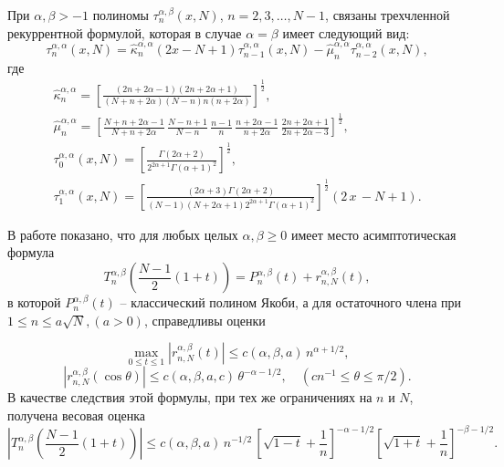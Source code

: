 При $\alpha, \beta > -1$ полиномы $\tau_n^{\alpha,\beta}(x,N)$, $n=2,3,\ldots,N-1$, связаны трехчленной рекуррентной формулой, которая в случае $\alpha=\beta$ имеет следующий вид:
\begin{equation}
\label{sob-tcheb-difference-3.19}
\tau_n^{\alpha,\alpha}(x,N)=
\hat\kappa^{\alpha,\alpha}_n(2x-N+1)\tau_{n-1}^{\alpha,\alpha}(x,N)-\hat\mu^{\alpha,\alpha}_n\tau_{n-2}^{\alpha,\alpha}(x,N),
\end{equation}
где
\begin{gather*}
\hat\kappa^{\alpha,\alpha}_n= \left[\frac{(2n+2\alpha-1)(2n+2\alpha+1)}{(N+n+2\alpha)(N-n)n(n+2\alpha)}\right]^\frac12,\\
\hat\mu^{\alpha,\alpha}_n=
\left[\frac{N+n+2\alpha-1}{N+n+2\alpha}\,\frac{N-n+1}{N-n}\,\frac{n-1}n\,
\frac{n+2\alpha-1}{n+2\alpha}\,\frac{2n+2\alpha+1}{2n+2\alpha-3}\right]^\frac12,\\
\tau_0^{\alpha,\alpha}(x,N)=\left[\frac{\Gamma(2\alpha+2)}{2^{2\alpha+1}\Gamma(\alpha+1)^2}\right]^\frac12,\\
\tau_1^{\alpha,\alpha}(x,N)=\left[\frac{(2\alpha+3)\Gamma(2\alpha+2)}{(N-1)(N+2\alpha+1)2^{2\alpha+1}\Gamma(\alpha+1)^2
}\right]^\frac12
(2\,x\,-N+1).
\end{gather*}


В работе \cite{sob-tcheb-difference-Shar16}%
показано, что для любых целых $\alpha,\beta \geq 0$ имеет место асимптотическая формула
\begin{equation}\label{asymptf}
 T_{n}^{\alpha,\beta}\left( \frac{N-1}{2}(1+t) \right) = P_{n}^{\alpha,\beta}(t)+r_{n,N}^{\alpha,\beta}(t),
\end{equation}
в которой $P_{n}^{\alpha,\beta}(t)$ -- классический полином Якоби, а для остаточного члена при $1 \leq n \leq a\sqrt{N}, (a>0)$, справедливы оценки

\begin{equation}\label{asymptRest1}
  \max\limits_{0\leq t \leq 1} |r_{n,N}^{\alpha,\beta}(t)| \leq c(\alpha,\beta,a)\,n^{\alpha+1/2},
\end{equation}
\begin{equation}\label{asymptRest1}
  |r_{n,N}^{\alpha,\beta}(\cos{\theta})| \leq c(\alpha,\beta,a,c)\,\theta^{-\alpha-1/2}, \quad \left( cn^{-1} \leq \theta \leq \pi/2\right).
\end{equation}
В качестве следствия этой формулы, при тех же ограничениях на $n$ и $N$, получена весовая оценка
\begin{equation}\label{weightEst}
  \left| T_{n}^{\alpha,\beta}\left(\frac{N-1}{2}(1+t)\right)\right| \leq
    c(\alpha,\beta,a)\,n^{-1/2}\,
    \left[  \sqrt{1-t} + \frac1n \right]^{-\alpha-1/2}
    \left[  \sqrt{1+t} + \frac1n \right]^{-\beta-1/2}.
\end{equation}











